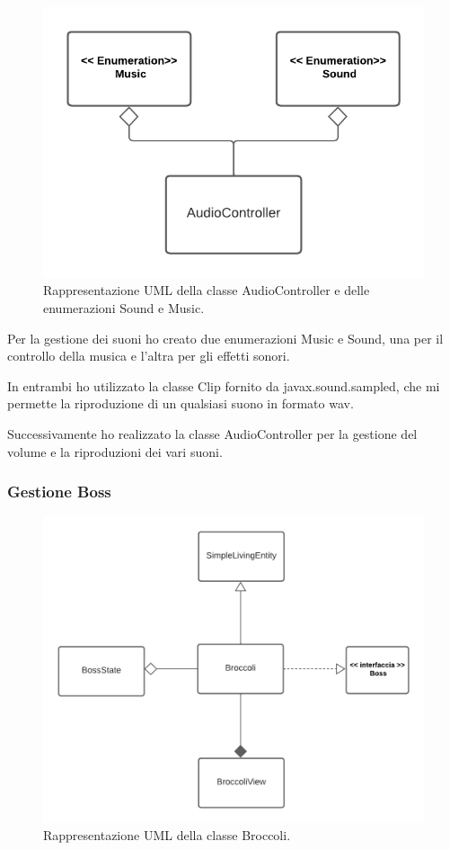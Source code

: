 \documentclass[a4paper,12pt]{report}
\begin{document}
    \begin{figure}[H]
        \centering{}
        \includegraphics[scale=1] {img/audio.png}
        \caption{Rappresentazione UML della classe AudioController e delle enumerazioni Sound e Music.}
        \label{img:audio}
    \end{figure}

    Per la gestione dei suoni ho creato due enumerazioni Music e Sound, una per il controllo della musica e l'altra  per gli effetti sonori.

    In entrambi ho utilizzato la classe Clip fornito da javax.sound.sampled, che mi permette la riproduzione di un qualsiasi suono in formato wav.

    Successivamente ho realizzato la classe AudioController per la gestione del volume e la  riproduzioni dei vari suoni.

    \subsubsection{Gestione Boss}

    \begin{figure}[H]
        \centering{}
        \includegraphics[scale=1] {img/boss.png}
        \caption{Rappresentazione UML della classe Broccoli.}
        \label{img:boss}
    \end{figure}
\end{document}
